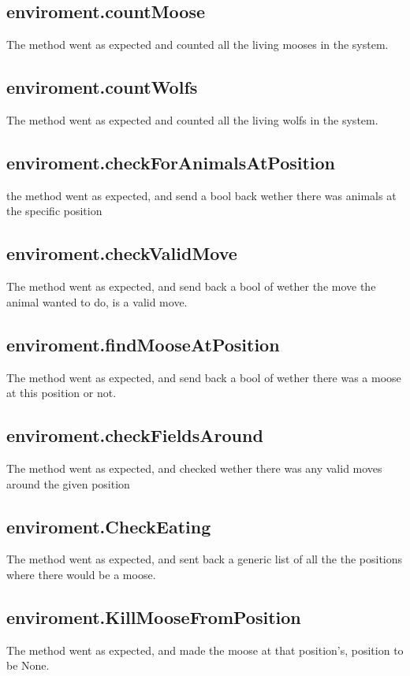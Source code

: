 \documentclass{article}
\begin{document}
    \subsection{enviroment.countMoose}
    The method went as expected and counted all the living mooses in the system.
    
    \subsection{enviroment.countWolfs}
    The method went as expected and counted all the living wolfs in the system.
    
    \subsection{enviroment.checkForAnimalsAtPosition}
    the method went as expected, and send a bool back wether there was animals at the specific position
    
    \subsection{enviroment.checkValidMove}
    The method went as expected, and send back a bool of wether the move the animal wanted to do, is a valid move.
    
    \subsection{enviroment.findMooseAtPosition}
    The method went as expected, and send back a bool of wether there was a moose at this position or not.
    
    \subsection{enviroment.checkFieldsAround}
    The method went as expected, and checked wether there was any valid moves around the given position
    
    \subsection{enviroment.CheckEating}
    The method went as expected, and sent back a generic list of all the the positions where there would be a moose.
    
    \subsection{enviroment.KillMooseFromPosition}
    The method went as expected, and made the moose at that position's, position to be None.
    
\end{document}
